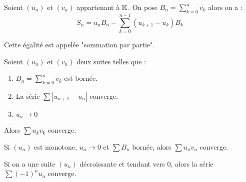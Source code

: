 \begin{lem}
Soient $(u_n)$ et $(v_n)$ appartenant à $\mathbb{K}$. On pose $B_n=\sum\limits_{k=0}^nv_k$ alors on a :
$$S_n = u_nB_n-\sum\limits_{k=0}^{n-1}(u_{k+1}-u_k)B_k$$
\end{lem}
\begin{rem}
Cette égalité est appelée "sommation par partie".
\end{rem}

\begin{thm}
Soient $(u_n)$ et $(v_n)$ deux suites telles que :
\begin{enumerate}
	\item $B_n=\sum\limits_{k=0}^nv_k$ est bornée.
	\item La série $\sum|u_{n+1}-u_n|$ converge.
	\item $u_n\to0$
\end{enumerate}
Alors $\sum u_kv_k$ converge.
\end{thm}


\begin{rem}\end{rem}

\begin{coro}
Si $(u_n)$ est monotone, $u_n\to0$ et $\sum B_n$ bornée, alors $\sum u_nv_n$ converge.
\end{coro}
\begin{coro}
Si on a une suite $(u_n)$ décroissante et tendant vers 0, alors la série $\sum (-1)^nu_n$ converge.
\end{coro}
